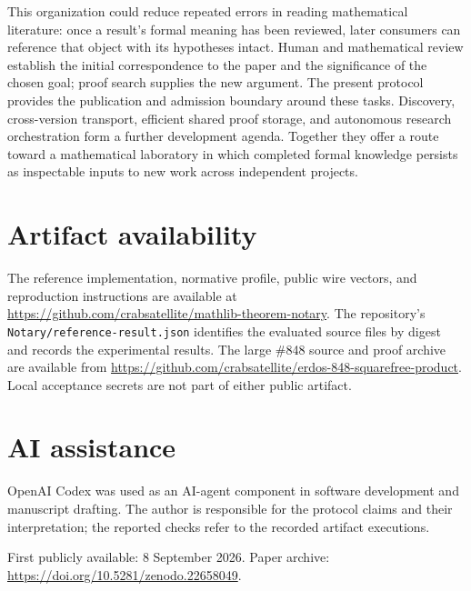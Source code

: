 \documentclass[11pt]{article}
\begin{document}
This organization could reduce repeated errors in reading mathematical
literature: once a result's formal meaning has been reviewed, later consumers
can reference that object with its hypotheses intact. Human and mathematical
review establish the initial correspondence to the paper and the significance
of the chosen goal; proof search supplies the new argument. The present
protocol provides the publication and admission boundary around these tasks.
Discovery, cross-version transport, efficient shared proof storage, and
autonomous research orchestration form a further development agenda. Together
they offer a route toward a mathematical laboratory in which completed formal
knowledge persists as inspectable inputs to new work across independent projects.

\section*{Artifact availability}
\label{sec:artifacts}
The reference implementation, normative profile, public wire vectors, and
reproduction instructions are available at
\url{https://github.com/crabsatellite/mathlib-theorem-notary}.
The repository's \texttt{Notary/reference-result.json} identifies the evaluated
source files by digest and records the experimental results. The large \#848
source and proof archive are available from
\url{https://github.com/crabsatellite/erdos-848-squarefree-product}.
Local acceptance secrets are not part of either public artifact.

\section*{AI assistance}
OpenAI Codex was used as an AI-agent component in software development and
manuscript drafting.
The author is responsible for the protocol claims and their interpretation;
the reported checks refer to the recorded artifact executions.

\begingroup
\small
\setlength{\bibsep}{3pt}


\endgroup
\par\medskip\noindent\small
First publicly available: 8 September 2026. Paper archive:
\url{https://doi.org/10.5281/zenodo.22658049}.
\end{document}
